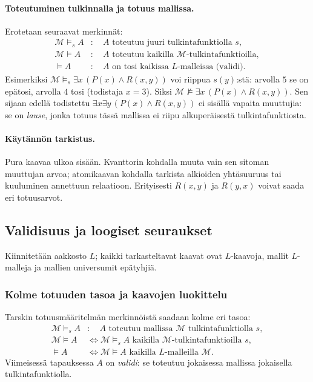 \documentclass[11pt,a4paper]{amsart}
\begin{document}
\paragraph{Toteutuminen tulkinnalla ja totuus mallissa.}
Erotetaan seuraavat merkinnät:
\begin{align*}
  \mathcal M\models_s A
  &:\quad A\text{ toteutuu juuri tulkintafunktiolla }s,\\
  \mathcal M\models A
  &:\quad A\text{ toteutuu kaikilla }\mathcal M
  \text{-tulkintafunktioilla},\\
  \models A
  &:\quad A\text{ on tosi kaikissa }L\text{-malleissa (validi).}
\end{align*}
Esimerkiksi $\mathcal M\models_s\exists x\,(P(x)\land R(x,y))$
voi riippua $s(y)$:stä: arvolla $5$ se on epätosi, arvolla $4$ tosi
(todistaja $x=3$). Siksi
$\mathcal M\not\models\exists x\,(P(x)\land R(x,y))$.
Sen sijaan edellä todistettu
$\exists x\exists y\,(P(x)\land R(x,y))$ ei sisällä vapaita
muuttujia: se on \emph{lause}, jonka totuus tässä mallissa ei riipu
alkuperäisestä tulkintafunktiosta.

\paragraph{Käytännön tarkistus.}
Pura kaavaa ulkoa sisään. Kvanttorin kohdalla muuta vain sen sitoman
muuttujan arvoa; atomikaavan kohdalla tarkista alkioiden yhtäsuuruus
tai kuuluminen annettuun relaatioon. Erityisesti
$R(x,y)$ ja $R(y,x)$ voivat saada eri totuusarvot.

\clearpage
\subsection{Validisuus ja loogiset seuraukset}

Kiinnitetään aakkosto $L$; kaikki tarkasteltavat kaavat ovat $L$-kaavoja,
mallit $L$-malleja ja mallien universumit epätyhjiä.

\subsubsection{Kolme totuuden tasoa ja kaavojen luokittelu}

\begin{definition}
  Tarskin totuusmääritelmän merkinnöistä saadaan kolme eri tasoa:
  \begin{align*}
    \mathcal M\models_s A
    &:\quad A\text{ toteutuu mallissa }\mathcal M
    \text{ tulkintafunktiolla }s,\\
    \mathcal M\models A
    &\iff \mathcal M\models_s A
    \text{ kaikilla }\mathcal M\text{-tulkintafunktioilla }s,\\
    \models A
    &\iff \mathcal M\models A\text{ kaikilla }L\text{-malleilla }\mathcal M.
  \end{align*}
  Viimeisessä tapauksessa $A$ on \emph{validi}: se toteutuu jokaisessa
  mallissa jokaisella tulkintafunktiolla.
\end{definition}
\end{document}
